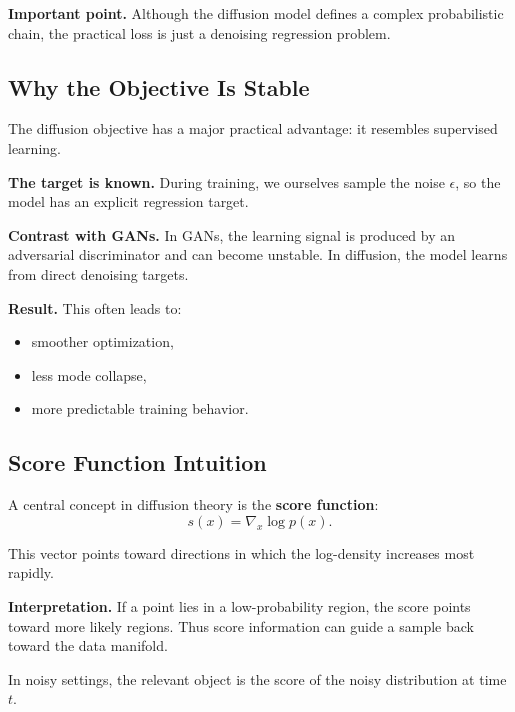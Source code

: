 \medskip

\noindent
\textbf{Important point.}
Although the diffusion model defines a complex probabilistic chain, the practical loss is just a denoising regression problem.

\subsection{Why the Objective Is Stable}

The diffusion objective has a major practical advantage: it resembles supervised learning.

\medskip

\noindent
\textbf{The target is known.}
During training, we ourselves sample the noise $\epsilon$, so the model has an explicit regression target.

\medskip

\noindent
\textbf{Contrast with GANs.}
In GANs, the learning signal is produced by an adversarial discriminator and can become unstable. In diffusion, the model learns from direct denoising targets.

\medskip

\noindent
\textbf{Result.}
This often leads to:
\begin{itemize}
    \item smoother optimization,
    \item less mode collapse,
    \item more predictable training behavior.
\end{itemize}

\subsection{Score Function Intuition}

A central concept in diffusion theory is the \textbf{score function}:
\[
s(x)=\nabla_x \log p(x).
\]

\medskip

\noindent
This vector points toward directions in which the log-density increases most rapidly.

\medskip

\noindent
\textbf{Interpretation.}
If a point lies in a low-probability region, the score points toward more likely regions. Thus score information can guide a sample back toward the data manifold.

\medskip

\noindent
In noisy settings, the relevant object is the score of the noisy distribution at time $t$.

